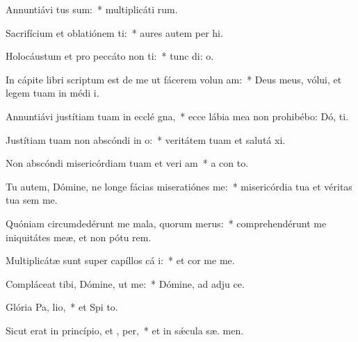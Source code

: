 \item Annuntiávi  tus sum:~* multiplicáti   rum.
\item Sacrifícium et oblatiónem ti:~* aures autem per hi.
\item Holocáustum et pro peccáto non ti:~* tunc di:  o.
\item In cápite libri scriptum est de me ut fácerem volun am:~* Deus meus, vólui, et legem tuam in médi  i.
\item Annuntiávi justítiam tuam in ecclé gna,~* ecce lábia mea non prohibébo: Dó,  ti.
\item Justítiam tuam non abscóndi in  o:~* veritátem tuam et salutá  xi.
\item Non abscóndi misericórdiam tuam et veri am~* a con to.
\item Tu autem, Dómine, ne longe fácias miseratiónes   me:~* misericórdia tua et véritas tua sem  me.
\item Quóniam circumdedérunt me mala, quorum   merus:~* comprehendérunt me iniquitátes meæ, et non pótu  rem.
\item Multiplicátæ sunt super capíllos cá i:~* et cor me  me.
\item Compláceat tibi, Dómine, ut  me:~* Dómine, ad adju  ce.
\item Glória Pa,  lio,~* et Spi to.
\item Sicut erat in princípio, et ,  per,~* et in sǽcula sæ. men.
